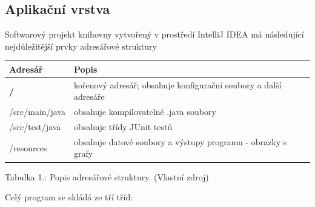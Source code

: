 \documentclass[a4paper,12pt,twoside]{scrreprt}
\begin{document}
\newpage
\subsection{Aplikační vrstva}

Softwarový projekt knihovny vytvořený v prostředí IntelliJ IDEA má následující nejdůležitější prvky adresářové struktury
\vspace*{0.5cm}

\begin{tabular}{|l|p{12cm}|}
  \hline
  {\bf Adresář} & {\bf Popis} \\
  \hline 
   {\bf /}        & kořenový adresář; obsahuje konfigurační soubory a další adresáře \\ 
  \hline
  /src/main/java     & obsahuje kompilovatelné .java soubory \\
  \hline
  /src/test/java          & obsahuje třídy JUnit testů \\
 \hline
  /resources    & obsahuje datové soubory a výstupy programu - obrazky s grafy\\
 \hline
\end{tabular}
\vspace*{0.2cm}

\centerline {Tabulka 1.: Popis adresářové struktury. (Vlastní zdroj)}

Celý program se skládá ze tří tříd: 
\end{document}

